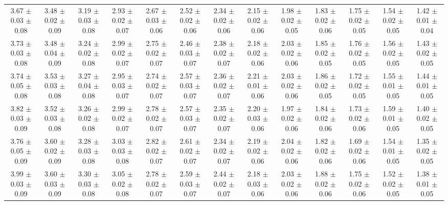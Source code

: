 \begin{landscape}
{\begin{tabular}{  | c | c | c | c | c | c | c | c | c | c | c | c | c | }
3.67 $\pm$0.03 $\pm$0.08 & 3.48 $\pm$0.02 $\pm$0.09 & 3.19 $\pm$0.03 $\pm$0.08 & 2.93 $\pm$0.02 $\pm$0.07 & 2.67 $\pm$0.03 $\pm$0.06 & 2.52 $\pm$0.02 $\pm$0.06 & 2.34 $\pm$0.02 $\pm$0.06 & 2.15 $\pm$0.02 $\pm$0.06 & 1.98 $\pm$0.02 $\pm$0.05 & 1.83 $\pm$0.02 $\pm$0.06 & 1.75 $\pm$0.02 $\pm$0.05 & 1.54 $\pm$0.02 $\pm$0.05 & 1.42 $\pm$0.01 $\pm$0.04\\
3.73 $\pm$0.03 $\pm$0.08 & 3.48 $\pm$0.04 $\pm$0.09 & 3.24 $\pm$0.02 $\pm$0.08 & 2.99 $\pm$0.02 $\pm$0.07 & 2.75 $\pm$0.02 $\pm$0.07 & 2.46 $\pm$0.03 $\pm$0.07 & 2.38 $\pm$0.02 $\pm$0.07 & 2.18 $\pm$0.02 $\pm$0.06 & 2.03 $\pm$0.02 $\pm$0.06 & 1.85 $\pm$0.02 $\pm$0.05 & 1.76 $\pm$0.02 $\pm$0.05 & 1.56 $\pm$0.02 $\pm$0.05 & 1.43 $\pm$0.02 $\pm$0.05\\
3.74 $\pm$0.05 $\pm$0.08 & 3.53 $\pm$0.03 $\pm$0.08 & 3.27 $\pm$0.04 $\pm$0.08 & 2.95 $\pm$0.03 $\pm$0.07 & 2.74 $\pm$0.02 $\pm$0.07 & 2.57 $\pm$0.03 $\pm$0.07 & 2.36 $\pm$0.02 $\pm$0.07 & 2.21 $\pm$0.01 $\pm$0.06 & 2.03 $\pm$0.02 $\pm$0.06 & 1.86 $\pm$0.02 $\pm$0.05 & 1.72 $\pm$0.02 $\pm$0.05 & 1.55 $\pm$0.01 $\pm$0.05 & 1.44 $\pm$0.01 $\pm$0.05\\
3.82 $\pm$0.03 $\pm$0.09 & 3.52 $\pm$0.03 $\pm$0.08 & 3.26 $\pm$0.02 $\pm$0.08 & 2.99 $\pm$0.02 $\pm$0.07 & 2.78 $\pm$0.02 $\pm$0.07 & 2.57 $\pm$0.03 $\pm$0.07 & 2.35 $\pm$0.02 $\pm$0.07 & 2.20 $\pm$0.03 $\pm$0.06 & 1.97 $\pm$0.02 $\pm$0.06 & 1.84 $\pm$0.02 $\pm$0.06 & 1.73 $\pm$0.02 $\pm$0.06 & 1.59 $\pm$0.01 $\pm$0.05 & 1.40 $\pm$0.02 $\pm$0.05\\
3.76 $\pm$0.05 $\pm$0.09 & 3.60 $\pm$0.02 $\pm$0.09 & 3.28 $\pm$0.03 $\pm$0.08 & 3.03 $\pm$0.03 $\pm$0.08 & 2.82 $\pm$0.02 $\pm$0.07 & 2.61 $\pm$0.02 $\pm$0.07 & 2.34 $\pm$0.02 $\pm$0.07 & 2.19 $\pm$0.02 $\pm$0.06 & 2.04 $\pm$0.02 $\pm$0.06 & 1.82 $\pm$0.02 $\pm$0.06 & 1.69 $\pm$0.02 $\pm$0.06 & 1.54 $\pm$0.01 $\pm$0.05 & 1.35 $\pm$0.02 $\pm$0.05\\
3.99 $\pm$0.03 $\pm$0.09 & 3.60 $\pm$0.03 $\pm$0.09 & 3.30 $\pm$0.03 $\pm$0.08 & 3.05 $\pm$0.02 $\pm$0.08 & 2.78 $\pm$0.02 $\pm$0.07 & 2.59 $\pm$0.03 $\pm$0.07 & 2.44 $\pm$0.02 $\pm$0.07 & 2.18 $\pm$0.03 $\pm$0.06 & 2.03 $\pm$0.02 $\pm$0.06 & 1.88 $\pm$0.02 $\pm$0.06 & 1.75 $\pm$0.02 $\pm$0.06 & 1.52 $\pm$0.02 $\pm$0.05 & 1.38 $\pm$0.01 $\pm$0.05\\
\hline
\end{tabular}}
\end{landscape}
